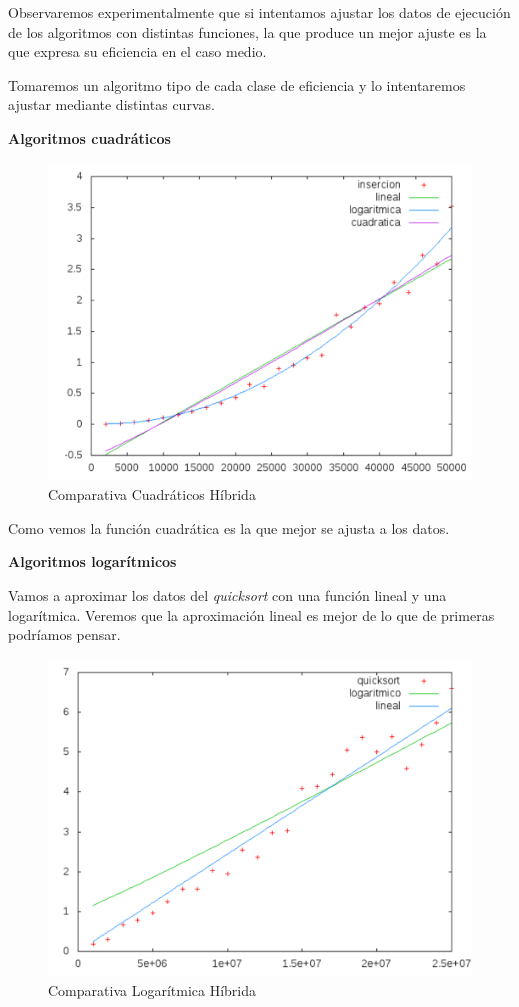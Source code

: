 \documentclass[a4paper, 11pt]{article}
\begin{document}
Observaremos experimentalmente que si intentamos ajustar los datos de ejecución de los algoritmos con distintas funciones, la que produce un mejor ajuste es la que expresa su eficiencia en el caso medio.

Tomaremos un algoritmo tipo de cada clase de eficiencia y lo intentaremos ajustar mediante distintas curvas.

\vspace{1cm}
\textbf{Algoritmos cuadráticos}

\begin{figure}[H]\includegraphics[width=13cm]{img/cuad_hibrida.pdf} \centering
	\caption{Comparativa Cuadráticos Híbrida}\end{figure}

Como vemos la función cuadrática es la que mejor se ajusta a los datos.

\vspace{1cm}

\textbf{Algoritmos logarítmicos}

Vamos a aproximar los datos del \textit{quicksort} con una función lineal y una logarítmica. Veremos que la aproximación lineal es mejor de lo que de primeras podríamos pensar.


\begin{figure}[H]\includegraphics[width=13cm]{img/log_hibrida.pdf} \centering
	\caption{Comparativa Logarítmica Híbrida}\end{figure}
\end{document}
